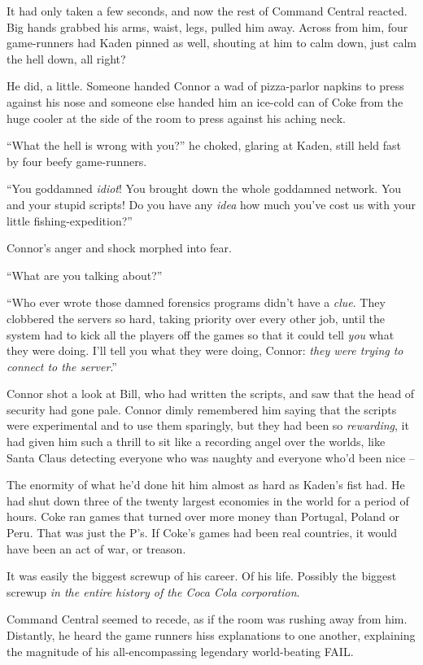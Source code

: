 It had only taken a few seconds, and now the rest of Command
Central reacted. Big hands grabbed his arms, waist, legs, pulled
him away. Across from him, four game-runners had Kaden pinned as
well, shouting at him to calm down, just calm the hell down, all
right?

He did, a little. Someone handed Connor a wad of pizza-parlor
napkins to press against his nose and someone else handed him an
ice-cold can of Coke from the huge cooler at the side of the room
to press against his aching neck.

``What the hell is wrong with you?'' he choked, glaring at Kaden,
still held fast by four beefy game-runners.

``You goddamned \emph{idiot}! You brought down the whole goddamned
network. You and your stupid scripts! Do you have any \emph{idea}
how much you've cost us with your little fishing-expedition?''

Connor's anger and shock morphed into fear.

``What are you talking about?''

``Who ever wrote those damned forensics programs didn't have a
\emph{clue}. They clobbered the servers so hard, taking priority
over every other job, until the system had to kick all the players
off the games so that it could tell \emph{you} what they were
doing. I'll tell you what they were doing, Connor:
\emph{they were trying to connect to the server}.''

Connor shot a look at Bill, who had written the scripts, and saw
that the head of security had gone pale. Connor dimly remembered
him saying that the scripts were experimental and to use them
sparingly, but they had been so \emph{rewarding}, it had given him
such a thrill to sit like a recording angel over the worlds, like
Santa Claus detecting everyone who was naughty and everyone who'd
been nice --

The enormity of what he'd done hit him almost as hard as Kaden's
fist had. He had shut down three of the twenty largest economies in
the world for a period of hours. Coke ran games that turned over
more money than Portugal, Poland or Peru. That was just the P's. If
Coke's games had been real countries, it would have been an act of
war, or treason.

It was easily the biggest screwup of his career. Of his life.
Possibly the biggest screwup
\emph{in the entire history of the Coca Cola corporation}.

Command Central seemed to recede, as if the room was rushing away
from him. Distantly, he heard the game runners hiss explanations to
one another, explaining the magnitude of his all-encompassing
legendary world-beating FAIL.

